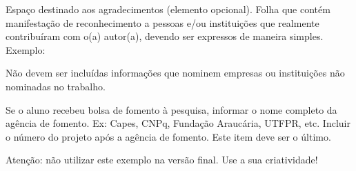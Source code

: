 
\begin{agradecimentos}[Agradecimentos]%

    Espaço destinado aos agradecimentos (elemento opcional). Folha que contém manifestação de
    reconhecimento a pessoas e/ou instituições que realmente contribuíram com o(a) autor(a), devendo
    ser expressos de maneira simples. Exemplo:
    
    Não devem ser incluídas informações que nominem empresas ou instituições não nominadas no
    trabalho.
    
    Se o aluno recebeu bolsa de fomento à pesquisa, informar o nome completo da agência de fomento.
    Ex: Capes, CNPq, Fundação Araucária, UTFPR, etc. Incluir o número do projeto após a agência de
    fomento. Este item deve ser o último.
    
    Atenção: não utilizar este exemplo na versão final. Use a sua criatividade!

\end{agradecimentos}
    